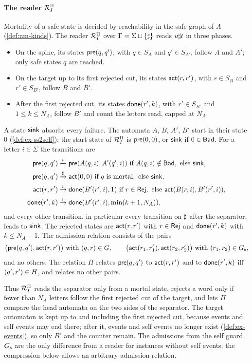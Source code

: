 

\paragraph{The reader $\mathcal{R}^{\Pi}_I$}
Mortality of a safe state is decided by reachability in the safe graph of $A$
(\cref{def:nm-kinds}). The reader $\mathcal{R}^{\Pi}_I$ over $\Gamma=\Sigma\sqcup\{\sharp\}$
reads $u\sharp t$ in three phases.
\begin{itemize}[leftmargin=*]
\item On the spine, its states $\mathsf{pre}(q,q')$, with $q\in S_A$ and
  $q'\in S_{A'}$, follow $A$ and $A'$; only safe states $q$ are reached.
\item On the target up to its first rejected cut, its states
  $\mathsf{act}(r,r')$, with $r\in S_B$ and $r'\in S_{B'}$, follow $B$ and $B'$.
\item After the first rejected cut, its states $\mathsf{done}(r',k)$, with
  $r'\in S_{B'}$ and $1\le k\le N_A$, follow $B'$ and count the letters read,
  capped at $N_A$.
\end{itemize}
A state $\mathsf{sink}$ absorbs every failure. The automata $A$, $B$, $A'$, $B'$
start in their state $0$ (\cref{def:ex-ss2self}); the start state of $\mathcal{R}^{\Pi}_I$ is
$\mathsf{pre}(0,0)$, or $\mathsf{sink}$ if $0\in\mathsf{Bad}$. For a letter $i\in\Sigma$ the
transitions are
\[
\begin{aligned}
 \mathsf{pre}(q,q')&\xrightarrow{i}\mathsf{pre}(A(q,i),A'(q',i))
   \ \text{if }A(q,i)\notin\mathsf{Bad},\text{ else }\mathsf{sink},\\
 \mathsf{pre}(q,q')&\xrightarrow{\sharp}\mathsf{act}(0,0)
   \ \text{if $q$ is mortal},\text{ else }\mathsf{sink},\\
 \mathsf{act}(r,r')&\xrightarrow{i}\mathsf{done}(B'(r',i),1)
   \ \text{if }r\in\mathsf{Rej},\text{ else }\mathsf{act}(B(r,i),B'(r',i)),\\
 \mathsf{done}(r',k)&\xrightarrow{i}\mathsf{done}(B'(r',i),\min(k+1,N_A)),
\end{aligned}
\]
and every other transition, in particular every transition on $\sharp$ after the separator,
leads to $\mathsf{sink}$. The rejected states are $\mathsf{act}(r,r')$ with $r\in\mathsf{Rej}$ and
$\mathsf{done}(r',k)$ with $k\le N_A-1$. The admission relation consists of the pairs
\[
 \bigl(\mathsf{pre}(q,q'),\mathsf{act}(r,r')\bigr)\ \text{with }(q,r)\in G,
 \qquad
 \bigl(\mathsf{act}(r_1,r'_1),\mathsf{act}(r_2,r'_2)\bigr)\ \text{with }(r_1,r_2)\in G_{\mathrm{s}},
\]
and no others. The relation $\Pi$ relates $\mathsf{pre}(q,q')$ to $\mathsf{act}(r,r')$ and to
$\mathsf{done}(r',k)$ iff $(q',r')\in H$, and relates no other pairs.

Thus $\mathcal{R}^{\Pi}_I$ reads the separator only from a mortal state, rejects a word only if
fewer than $N_A$ letters follow the first rejected cut of the target, and lets
$\Pi$ compare the head automata on the two sides of the separator. The target
automaton is kept up to and including the first rejected cut, because events
and self events may end there; after it, events and self events no longer
exist (\cref{def:ex-events}), so only $B'$ and the counter remain. The admissions
from the self guard $G_{\mathrm{s}}$ are the only difference from a reader for
instances without self events; the compression below allows an arbitrary admission relation.

